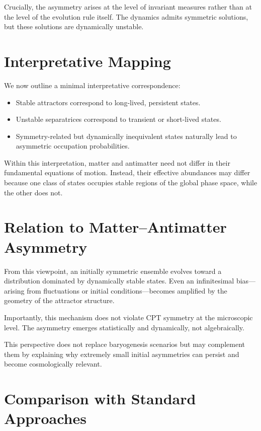 \documentclass[11pt]{article}
\begin{document}
Crucially, the asymmetry arises at the level of invariant measures rather than
at the level of the evolution rule itself. The dynamics admits symmetric
solutions, but these solutions are dynamically unstable.

\section{Interpretative Mapping}

We now outline a minimal interpretative correspondence:

\begin{itemize}
\item Stable attractors correspond to long-lived, persistent states.
\item Unstable separatrices correspond to transient or short-lived states.
\item Symmetry-related but dynamically inequivalent states naturally lead to
asymmetric occupation probabilities.
\end{itemize}

Within this interpretation, matter and antimatter need not differ in their
fundamental equations of motion. Instead, their effective abundances may differ
because one class of states occupies stable regions of the global phase space,
while the other does not.

\section{Relation to Matter--Antimatter Asymmetry}

From this viewpoint, an initially symmetric ensemble evolves toward a
distribution dominated by dynamically stable states. Even an infinitesimal
bias—arising from fluctuations or initial conditions—becomes amplified by the
geometry of the attractor structure.

Importantly, this mechanism does not violate CPT symmetry at the microscopic
level. The asymmetry emerges statistically and dynamically, not algebraically.

This perspective does not replace baryogenesis scenarios but may complement
them by explaining why extremely small initial asymmetries can persist and
become cosmologically relevant.

\section{Comparison with Standard Approaches}
\end{document}
